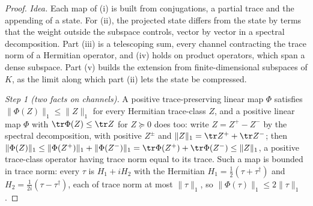 \begin{proof}
\emph{Idea.} Each map of (i) is built from conjugations, a partial trace and
the appending of a state. For (ii), the projected state differs from the
state by terms that the weight outside the subspace controls, vector by
vector in a spectral decomposition. Part (iii) is a telescoping sum, every
channel contracting the trace norm of a Hermitian operator, and (iv) holds on
product operators, which span a dense subspace. Part (v) builds the extension
from finite-dimensional subspaces of $K$, as the limit along which part (ii)
lets the state be compressed.

\emph{Step 1 (two facts on channels).} A positive trace-preserving linear map
$\Phi$ satisfies $\|\Phi(Z)\|_1\le\|Z\|_1$ for every Hermitian trace-class
$Z$, and a positive linear map $\Phi$ with $\tr\Phi(Z)\le\tr Z$ for $Z\succeq0$
does too: write $Z=Z^{+}-Z^{-}$ by the spectral decomposition, with positive
$Z^{\pm}$ and $\|Z\|_1=\tr Z^{+}+\tr Z^{-}$; then
$\|\Phi(Z)\|_1\le\|\Phi(Z^{+})\|_1+\|\Phi(Z^{-})\|_1
=\tr\Phi(Z^{+})+\tr\Phi(Z^{-})\le\|Z\|_1$, a positive trace-class operator
having trace norm equal to its trace. Such a map is bounded in trace norm:
every $\tau$ is $H_1+iH_2$ with the Hermitian
$H_1=\tfrac12(\tau+\tau^{\dagger})$ and $H_2=\tfrac1{2i}(\tau-\tau^{\dagger})$,
each of trace norm at most $\|\tau\|_1$, so $\|\Phi(\tau)\|_1\le2\|\tau\|_1$.


\end{proof}
